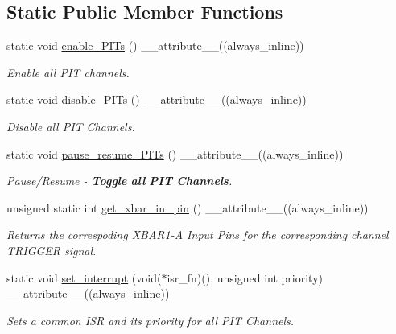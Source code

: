 \subsection*{Static Public Member Functions}
\begin{DoxyCompactItemize}
\item 
static void \hyperlink{classPITController_aa742977692efbc075b52a5dbd6533230}{enable\+\_\+\+P\+I\+Ts} () \+\_\+\+\_\+attribute\+\_\+\+\_\+((always\+\_\+inline))
\begin{DoxyCompactList}\small\item\em Enable all P\+IT channels. \end{DoxyCompactList}\item 
static void \hyperlink{classPITController_a5e1bf9f8053a51c68f0ff2178ab56954}{disable\+\_\+\+P\+I\+Ts} () \+\_\+\+\_\+attribute\+\_\+\+\_\+((always\+\_\+inline))
\begin{DoxyCompactList}\small\item\em Disable all P\+IT Channels. \end{DoxyCompactList}\item 
static void \hyperlink{classPITController_a24b7ea02555967ef945ab87aae338574}{pause\+\_\+resume\+\_\+\+P\+I\+Ts} () \+\_\+\+\_\+attribute\+\_\+\+\_\+((always\+\_\+inline))
\begin{DoxyCompactList}\small\item\em Pause/\+Resume -\/ {\bfseries Toggle} {\bfseries all} {\bfseries P\+IT} {\bfseries Channels}. \end{DoxyCompactList}\item 
unsigned static int \hyperlink{classPITController_a7cb352b2deb5bba48b8e2f0671a66801}{get\+\_\+xbar\+\_\+in\+\_\+pin} () \+\_\+\+\_\+attribute\+\_\+\+\_\+((always\+\_\+inline))
\begin{DoxyCompactList}\small\item\em Returns the correspoding X\+B\+A\+R1-\/A Input Pins for the corresponding channel T\+R\+I\+G\+G\+ER signal. \end{DoxyCompactList}\item 
static void \hyperlink{classPITController_aa94b6dc081d453c8dda54c3ade4b3d94}{set\+\_\+interrupt} (void($\ast$isr\+\_\+fn)(), unsigned int priority) \+\_\+\+\_\+attribute\+\_\+\+\_\+((always\+\_\+inline))
\begin{DoxyCompactList}\small\item\em Sets a common I\+SR and its priority for all P\+IT Channels. \end{DoxyCompactList}\end{DoxyCompactItemize}
